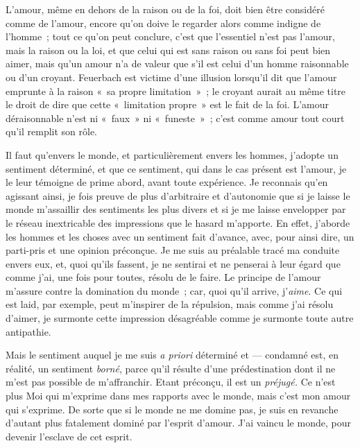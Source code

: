 \documentclass[french,twoside]{book} %
\begin{document}
L’amour, même en dehors de la raison ou de la foi, doit bien être considéré comme de l’amour, encore qu’on doive le regarder alors comme indigne de l’homme ; tout ce qu’on peut conclure, c’est que l’essentiel n’est pas l’amour, mais la raison ou la loi, et que celui qui est sans raison ou sans foi peut bien aimer, mais qu’un amour n’a de valeur que s’il est celui d’un homme raisonnable ou d’un croyant. Feuerbach est victime d’une illusion lorsqu’il dit que l’amour emprunte à la raison « sa propre limitation » ; le croyant aurait au même titre le droit de dire que cette « limitation propre » est le fait de la foi. L’amour déraisonnable n’est ni « faux » ni « funeste » ; c’est comme amour tout court qu’il remplit son rôle.\par
Il faut qu’envers le monde, et particulièrement envers les hommes, j’adopte un sentiment déterminé, et que ce sentiment, qui dans le cas présent est l’amour, je le leur témoigne de prime abord, avant toute expérience. Je reconnais qu’en agissant ainsi, je fois preuve de plus d’arbitraire et d’autonomie que si je laisse le monde m’assaillir des sentiments les plus divers et si je me laisse envelopper par le réseau inextricable des impressions que le hasard m’apporte. En effet, j’aborde les hommes et les choses avec un sentiment fait d’avance, avec, pour ainsi dire, un parti-pris et une opinion préconçue. Je me suis au préalable tracé ma conduite envers eux, et, quoi qu’ils fassent, je ne sentirai et ne penserai à leur égard que comme j’ai, une fois pour toutes, résolu de le faire.  Le principe de l’amour m’assure contre la domination du monde ; car, quoi qu’il arrive, j’\emph{aime}. Ce qui est laid, par exemple, peut m’inspirer de la répulsion, mais comme j’ai résolu d’aimer, je surmonte cette impression désagréable comme je surmonte toute autre antipathie.\par
Mais le sentiment auquel je me suis \emph{a priori} déterminé et — condamné est, en réalité, un sentiment \emph{borné}, parce qu’il résulte d’une prédestination dont il ne m’est pas possible de m’affranchir. Etant préconçu, il est un \emph{préjugé.} Ce n’est plus Moi qui m’exprime dans mes rapports avec le monde, mais c’est mon amour qui s’exprime. De sorte que si le monde ne me domine pas, je suis en revanche d’autant plus fatalement dominé par l’esprit d’amour. J’ai vaincu le monde, pour devenir l’esclave de cet esprit.\par
\end{document}
